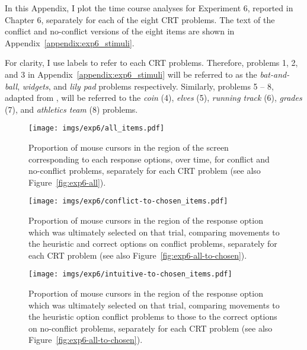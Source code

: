 
In this Appendix, I plot the time course analyses
for Experiment 6, reported in Chapter 6,
separately for each of the eight CRT problems.
The text of the conflict and no-conflict versions
of the eight items are shown in Appendix~\ref{appendix:exp6_stimuli}.

For clarity, I use labels to refer to each CRT problems.
Therefore, problems 1, 2, and 3 in Appendix~\ref{appendix:exp6_stimuli}
\citep[the original CRT items, from][]{Frederick2005} will be referred to as
the \emph{bat-and-ball}, \emph{widgets}, and \emph{lily pad} problems respectively.
Similarly, problems 5 -- 8, adapted from \citet{Primi2015},
will be referred to the
\emph{coin} (4),
\emph{elves} (5),
\emph{running track} (6),
\emph{grades} (7),
and \emph{athletics team} (8)
problems.


\begin{figure}[h]
  \centering
  \texttt{[image: imgs/exp6/all\_items.pdf]}
  \caption[]{
    Proportion of mouse cursors in the region of the screen 
    corresponding to each response options, over time, 
    for conflict and no-conflict problems,
    separately for each CRT problem
    (see also Figure~\ref{fig:exp6-all}).
  }
\end{figure}

\begin{figure}[h]
  \centering
  \texttt{[image: imgs/exp6/conflict-to-chosen\_items.pdf]}
  \caption[]{
    Proportion of mouse cursors in the region of
    the response option which was ultimately selected on that trial,
    comparing movements to the heuristic and correct options on conflict problems,
    separately for each CRT problem
    (see also Figure~\ref{fig:exp6-all-to-chosen}).
  }
\end{figure}

\begin{figure}[h]
  \centering
  \texttt{[image: imgs/exp6/intuitive-to-chosen\_items.pdf]}
  \caption[]{
    Proportion of mouse cursors in the region of
    the response option which was ultimately selected on that trial,
    comparing movements to the heuristic option conflict problems
    to those to the correct options on no-conflict problems,
    separately for each CRT problem
    (see also Figure~\ref{fig:exp6-all-to-chosen}).
    \label{fig:exp6-heuristic-to-chosen-by-item}
  }
\end{figure}


